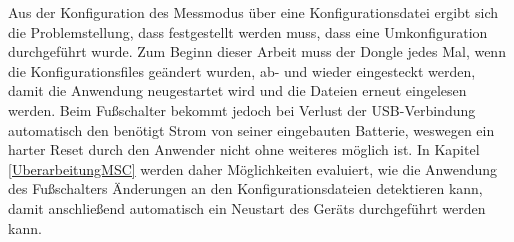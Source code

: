 Aus der Konfiguration des Messmodus über eine Konfigurationsdatei ergibt sich die Problemstellung, dass festgestellt werden muss, dass eine Umkonfiguration durchgeführt wurde. Zum Beginn dieser Arbeit muss der Dongle jedes Mal, wenn die Konfigurationsfiles geändert wurden, ab- und wieder eingesteckt werden, damit die Anwendung neugestartet wird und die Dateien erneut eingelesen werden. Beim Fußschalter bekommt jedoch bei Verlust der \ac{USB}-Verbindung automatisch den benötigt Strom von seiner eingebauten Batterie, weswegen ein harter Reset durch den Anwender nicht ohne weiteres möglich ist. In Kapitel \ref{UberarbeitungMSC} werden daher Möglichkeiten evaluiert, wie die Anwendung des Fußschalters Änderungen an den Konfigurationsdateien detektieren kann, damit anschließend automatisch ein Neustart des Geräts durchgeführt werden kann.

